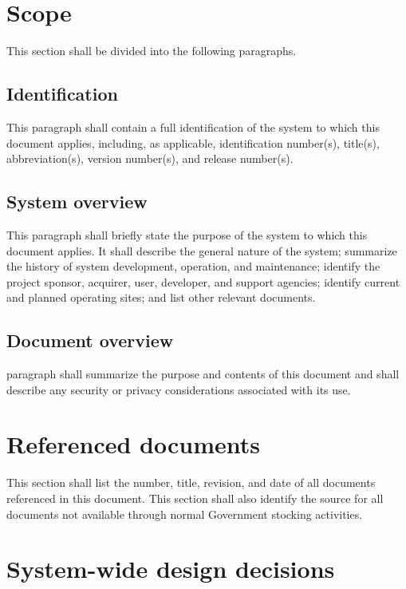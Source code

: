 \section{Scope}

This section shall be divided into the following paragraphs.

\subsection{Identification}

This paragraph shall contain a full identification of the system to
which this document applies, including, as applicable, identification
number(s), title(s), abbreviation(s), version number(s), and release
number(s).

\subsection{System overview}

This paragraph shall briefly state the purpose of the system to which
this document applies. It shall describe the general nature of the
system; summarize the history of system development, operation, and
maintenance; identify the project sponsor, acquirer, user, developer,
and support agencies; identify current and planned operating sites; and
list other relevant documents.

\subsection{Document overview}

paragraph shall summarize the purpose and contents of this document and
shall describe any security or privacy considerations associated with
its use.

\section{Referenced documents}

This section shall list the number, title, revision, and date of all
documents referenced in this document. This section shall also identify
the source for all documents not available through normal Government
stocking activities.

\section{System-wide design decisions}

